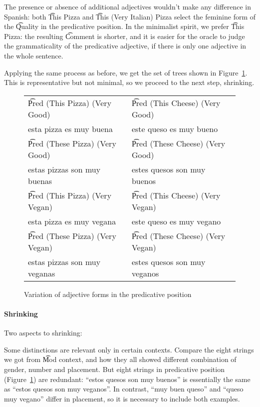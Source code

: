 The presence or absence of additional adjectives wouldn't make any
difference in Spanish: both \t{This Pizza} and \t{This (Very Italian)
 Pizza} select the feminine form of the \t{Quality} in the predicative
position. In the minimalist spirit, we prefer \t{This Pizza}: the
resulting \t{Comment} is shorter, and it is easier for the oracle to
judge the grammaticality of the predicative adjective, if there is
only one adjective in the whole sentence. 

Applying the same process as before, we get the set of trees shown in 
Figure~\ref{fig:goodCheese}. This is representative but not minimal,
so we proceed to the next step, shrinking.

\begin{figure}
\centering
\begin{tabular}{| l | l |}
\hline
\t{Pred (This Pizza) (Very Good)}   & \t{Pred (This Cheese) (Very Good)} \\ 
esta pizza es muy buena             & este queso es muy bueno \\ \hline
\t{Pred (These Pizza) (Very Good)}  & \t{Pred (These Cheese) (Very Good)} \\ 
estas pizzas son muy buenas         & estes quesos son muy buenos \\ \hline
\t{Pred (This Pizza) (Very Vegan)}   & \t{Pred (This Cheese) (Very Vegan)} \\ 
esta pizza es muy vegana             & este queso es muy vegano \\ \hline
\t{Pred (These Pizza) (Very Vegan)}  & \t{Pred (These Cheese) (Very Vegan)} \\ 
estas pizzas son muy veganas         & estes quesos son muy veganos \\ \hline
\end{tabular}
\caption{Variation of adjective forms in the predicative position}
\label{fig:goodCheese}
\end{figure}


\paragraph{Shrinking}

Two aspects to shrinking:

Some distinctions are relevant only in certain
contexts. Compare the eight strings we got from \t{Mod} context, and
how they all showed different combination of gender, number and
placement. But eight strings in predicative position (Figure~\ref{fig:goodCheese})
are redundant: ``estos quesos son muy buenos'' is essentially the same
as ``estos quesos son muy veganos''. In contrast, ``muy buen queso''
and ``queso muy vegano'' differ in placement, so it is necessary to
include both examples.

